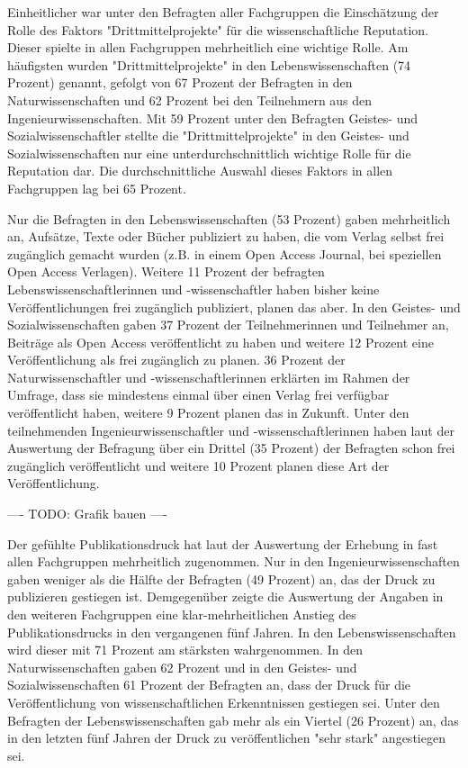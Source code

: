 Einheitlicher war unter den Befragten aller Fachgruppen die Einschätzung der Rolle des Faktors "Drittmittelprojekte" für die wissenschaftliche Reputation. Dieser spielte in allen Fachgruppen mehrheitlich eine wichtige Rolle. Am häufigsten wurden "Drittmittelprojekte" in den Lebenswissenschaften (74 Prozent) genannt, gefolgt von 67 Prozent der Befragten in den Naturwissenschaften und 62 Prozent bei den Teilnehmern aus den Ingenieurwissenschaften. Mit 59 Prozent unter den Befragten Geistes- und Sozialwissenschaftler stellte die "Drittmittelprojekte" in den Geistes- und Sozialwissenschaften nur eine unterdurchschnittlich wichtige Rolle für die Reputation dar. Die durchschnittliche Auswahl dieses Faktors in allen Fachgruppen lag bei 65 Prozent.

Nur die Befragten in den Lebenswissenschaften (53 Prozent) gaben mehrheitlich an, Aufsätze, Texte oder Bücher publiziert zu haben, die vom Verlag selbst frei zugänglich gemacht wurden (z.B. in einem Open Access Journal, bei speziellen Open Access Verlagen). Weitere 11 Prozent der befragten Lebenswissenschaftlerinnen und -wissenschaftler haben bisher keine Veröffentlichungen frei zugänglich publiziert, planen das aber. In den Geistes- und Sozialwissenschaften gaben 37 Prozent der Teilnehmerinnen und Teilnehmer an, Beiträge als Open Access veröffentlicht zu haben und weitere 12 Prozent eine Veröffentlichung als frei zugänglich zu planen. 36 Prozent der Naturwissenschaftler und -wissenschaftlerinnen erklärten im Rahmen der Umfrage, dass sie mindestens einmal über einen Verlag frei verfügbar veröffentlicht haben, weitere 9 Prozent planen das in Zukunft. Unter den teilnehmenden Ingenieurwissenschaftler und -wissenschaftlerinnen haben laut der Auswertung der Befragung über ein Drittel (35 Prozent) der Befragten schon frei zugänglich veröffentlicht und weitere 10 Prozent planen diese Art der Veröffentlichung.

---- TODO: Grafik bauen ----

Der gefühlte Publikationsdruck hat laut der Auswertung der Erhebung in fast allen Fachgruppen mehrheitlich zugenommen. Nur in den Ingenieurwissenschaften gaben weniger als die Hälfte der Befragten (49 Prozent) an, das der Druck zu publizieren gestiegen ist. Demgegenüber zeigte die Auswertung der Angaben in den weiteren Fachgruppen eine klar-mehrheitlichen Anstieg des Publikationsdrucks in den vergangenen fünf Jahren. In den Lebenswissenschaften wird dieser mit 71 Prozent am stärksten wahrgenommen. In den Naturwissenschaften gaben 62 Prozent und in den Geistes- und Sozialwissenschaften 61 Prozent der Befragten an, dass der Druck für die Veröffentlichung von wissenschaftlichen Erkenntnissen gestiegen sei. Unter den Befragten der Lebenswissenschaften gab mehr als ein Viertel (26 Prozent) an, das in den letzten fünf Jahren der Druck zu veröffentlichen "sehr stark" angestiegen sei.

